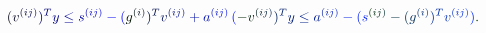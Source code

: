 \documentclass[12pt]{article}
\begin{document}
\makeatletter
\renewcommand*{\@textcolor}[3]{%
  \protect\leavevmode
  \begingroup
    \color#1{#2}#3%
  \endgroup
}
\makeatother
\begin{displaymath}
\mathcolor[RGB]{0,0,15}{(} \mathcolor[RGB]{0,0,30}{v} ^ { \mathcolor[RGB]{0,0,45}{(} \mathcolor[RGB]{0,0,60}{i} \mathcolor[RGB]{0,0,75}{j} \mathcolor[RGB]{0,0,90}{)} } \mathcolor[RGB]{0,0,105}{)} ^ { \mathcolor[RGB]{0,0,120}{T} } \mathcolor[RGB]{0,0,135}{y} \mathcolor[RGB]{0,0,150}{\leq} \mathcolor[RGB]{0,0,165}{s} ^ { \mathcolor[RGB]{0,0,180}{(} \mathcolor[RGB]{0,0,195}{i} \mathcolor[RGB]{0,0,210}{j} \mathcolor[RGB]{0,0,225}{)} } \mathcolor[RGB]{0,0,240}{-} \mathcolor[RGB]{0,0,255}{(} \mathcolor[RGB]{0,15,0}{g} ^ { \mathcolor[RGB]{0,15,15}{(} \mathcolor[RGB]{0,15,30}{i} \mathcolor[RGB]{0,15,45}{)} } \mathcolor[RGB]{0,15,60}{)} ^ { \mathcolor[RGB]{0,15,75}{T} } \mathcolor[RGB]{0,15,90}{v} ^ { \mathcolor[RGB]{0,15,105}{(} \mathcolor[RGB]{0,15,120}{i} \mathcolor[RGB]{0,15,135}{j} \mathcolor[RGB]{0,15,150}{)} } \mathcolor[RGB]{0,15,165}{+} \mathcolor[RGB]{0,15,180}{a} ^ { \mathcolor[RGB]{0,15,195}{(} \mathcolor[RGB]{0,15,210}{i} \mathcolor[RGB]{0,15,225}{j} \mathcolor[RGB]{0,15,240}{)} } \mathcolor[RGB]{0,15,255}{\,
(} \mathcolor[RGB]{0,30,0}{-} \mathcolor[RGB]{0,30,15}{v} ^ { \mathcolor[RGB]{0,30,30}{(} \mathcolor[RGB]{0,30,45}{i} \mathcolor[RGB]{0,30,60}{j} \mathcolor[RGB]{0,30,75}{)} } \mathcolor[RGB]{0,30,90}{)} ^ { \mathcolor[RGB]{0,30,105}{T} } \mathcolor[RGB]{0,30,120}{y} \mathcolor[RGB]{0,30,135}{\leq} \mathcolor[RGB]{0,30,150}{a} ^ { \mathcolor[RGB]{0,30,165}{(} \mathcolor[RGB]{0,30,180}{i} \mathcolor[RGB]{0,30,195}{j} \mathcolor[RGB]{0,30,210}{)} } \mathcolor[RGB]{0,30,225}{-} \mathcolor[RGB]{0,30,240}{(} \mathcolor[RGB]{0,30,255}{s} ^ { \mathcolor[RGB]{0,45,0}{(} \mathcolor[RGB]{0,45,15}{i} \mathcolor[RGB]{0,45,30}{j} \mathcolor[RGB]{0,45,45}{)} } \mathcolor[RGB]{0,45,60}{-} \mathcolor[RGB]{0,45,75}{(} \mathcolor[RGB]{0,45,90}{g} ^ { \mathcolor[RGB]{0,45,105}{(} \mathcolor[RGB]{0,45,120}{i} \mathcolor[RGB]{0,45,135}{)} } \mathcolor[RGB]{0,45,150}{)} ^ { \mathcolor[RGB]{0,45,165}{T} } \mathcolor[RGB]{0,45,180}{v} ^ { \mathcolor[RGB]{0,45,195}{(} \mathcolor[RGB]{0,45,210}{i} \mathcolor[RGB]{0,45,225}{j} \mathcolor[RGB]{0,45,240}{)} } \mathcolor[RGB]{0,45,255}{)} \mathcolor[RGB]{0,60,0}{.}
\end{displaymath}
\end{document}

